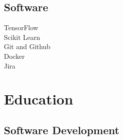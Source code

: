 \documentclass[letterpaper]{deedy-resume} %
\begin{document}
\begin{minipage}[t]{0.33\textwidth}


\sectionspace %



\subsection{Software}
TensorFlow \\
Scikit Learn \\
Git and Github \\
Docker \\
Jira \\


\sectionspace %


\section{Education} 

\subsection{Software Development}


\end{minipage}
\end{document}
